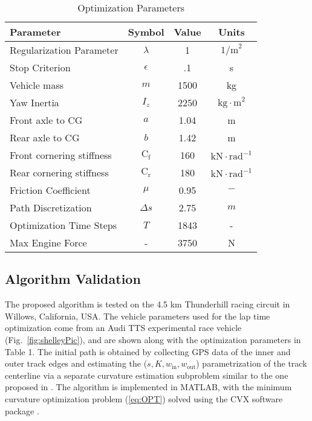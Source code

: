 \documentclass[twocolumn,10pt]{asme2ej}
\begin{document}
\begin{table}[h]
\begin{center}
\small
\caption{Optimization Parameters}\label{tb:params}
\begin{tabular}{lccc}
Parameter & Symbol & Value & Units \\\hline
Regularization Parameter & $\lambda$ & 1 & $\mathrm{1/m}^2$\\
Stop Criterion           & $\epsilon $ & .1 & s \\
Vehicle mass & $m$ & 1500 & kg \\
Yaw Inertia & $I_z$ & 2250 & $\mathrm{kg \cdot m}^2$\\
Front axle to CG & $a$ & 1.04 & m\\
Rear axle to CG & $b$ & 1.42 & m\\
Front cornering stiffness & $\mathrm{C}_\mathrm{f}$ & 160 & $\mathrm{kN \cdot rad}^{-1}$ \\
Rear cornering stiffness & $\mathrm{C}_\mathrm{r}$ & 180 & $\mathrm{kN \cdot rad}^{-1}$ \\
Friction Coefficient     & $\mu $                  &  0.95 & $\mathrm{-} $ \\
Path Discretization      & $\Delta s$              & 2.75 & $m$\\
Optimization Time Steps  & $T       $              & 1843 & -  \\
Max Engine Force         & -                       & 3750 & N\\\hline
\end{tabular}
\end{center}
\end{table}

\subsection{Algorithm Validation}
The proposed algorithm is tested on the 4.5 km Thunderhill racing circuit in Willows, California, USA. The vehicle parameters 
used for the lap time optimization come from an Audi TTS experimental race vehicle (Fig.~\ref{fig:shelleyPic}), and are shown along with the optimization parameters in Table 1.
 The initial path is obtained by collecting GPS data of the inner and outer track edges and estimating the ($s, K, w_\mathrm{in}, w_\mathrm{out}$)
 parametrization of the track centerline via a separate curvature estimation subproblem similar to the one proposed in \cite{perantoni}.
 The algorithm is implemented in MATLAB, with the minimum curvature optimization problem (\ref{eq:OPT}) solved using the CVX software package \cite{boydcvx}.
\end{document}
